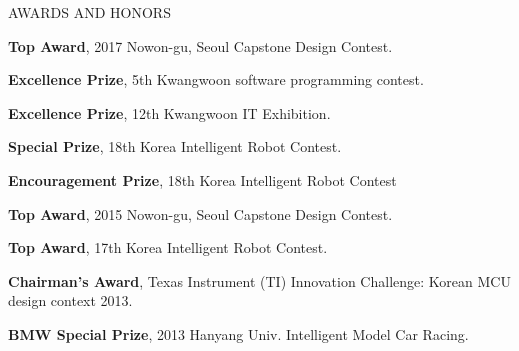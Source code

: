 \begin{rSection}{AWARDS AND HONORS}
    \begin{rSubsection}{}{}{}{}                
       \item \textbf{Top Award}, 2017 Nowon-gu, Seoul Capstone Design Contest.
       \item \textbf{Excellence Prize}, 5th Kwangwoon software programming contest.
       \item \textbf{Excellence Prize}, 12th Kwangwoon IT Exhibition.
       \item \textbf{Special Prize}, 18th Korea Intelligent Robot Contest.
       \item \textbf{Encouragement Prize}, 18th Korea Intelligent Robot Contest
       \item \textbf{Top Award}, 2015 Nowon-gu, Seoul Capstone Design Contest.
       \item \textbf{Top Award}{}, 17th Korea Intelligent Robot Contest.
       \item \textbf{Chairman's Award}, Texas Instrument (TI) Innovation Challenge: Korean MCU design context 2013.
       \item \textbf{BMW Special Prize}, 2013 Hanyang Univ. Intelligent Model Car Racing.
    \end{rSubsection}         
\end{rSection}
